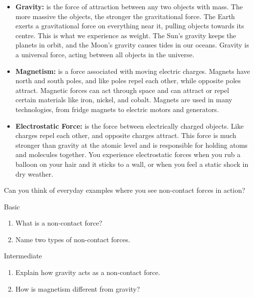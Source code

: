 \begin{itemize}
    \item \textbf{Gravity:}  is the force of attraction between any two objects with mass.  The more massive the objects, the stronger the gravitational force.  The Earth exerts a gravitational force on everything near it, pulling objects towards its centre.  This is what we experience as weight.  The Sun's gravity keeps the planets in orbit, and the Moon's gravity causes tides in our oceans. Gravity is a universal force, acting between all objects in the universe.

    \item \textbf{Magnetism:}  is a force associated with moving electric charges.  Magnets have north and south poles, and like poles repel each other, while opposite poles attract.  Magnetic forces can act through space and can attract or repel certain materials like iron, nickel, and cobalt.  Magnets are used in many technologies, from fridge magnets to electric motors and generators.

    \item \textbf{Electrostatic Force:}   is the force between electrically charged objects.  Like charges repel each other, and opposite charges attract.  This force is much stronger than gravity at the atomic level and is responsible for holding atoms and molecules together.  You experience electrostatic forces when you rub a balloon on your hair and it sticks to a wall, or when you feel a static shock in dry weather.
\end{itemize}

\begin{stopandthink}
Can you think of everyday examples where you see non-contact forces in action?
\end{stopandthink}

\begin{tieredquestions}{Basic}
\begin{enumerate}
    \item What is a non-contact force?
    \item Name two types of non-contact forces.
\end{enumerate}
\end{tieredquestions}

\begin{tieredquestions}{Intermediate}
\begin{enumerate}
    \item Explain how gravity acts as a non-contact force.
    \item How is magnetism different from gravity?
\end{enumerate}
\end{tieredquestions}

